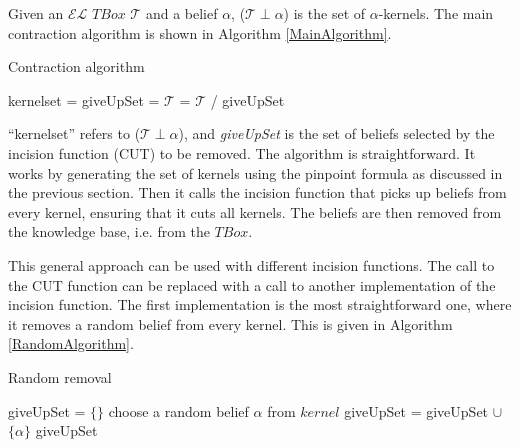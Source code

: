 Given an $\mathcal{EL}$ $TBox$ $\mathcal{T}$ and a belief $\alpha$, ($\mathcal{T} \perp \alpha$) is the set of $\alpha$-kernels. The main contraction algorithm is shown in Algorithm \ref{MainAlgorithm}.

\begin{algorithm}
\caption{Contraction algorithm}
\label{MainAlgorithm}
\begin{algorithmic}[1]
\State kernelset = 
\State giveUpSet = 
\State $\mathcal{T}$ = $\mathcal{T}$ / giveUpSet
\EndProcedure
\end{algorithmic}
\end{algorithm}

``kernelset'' refers to ($\mathcal{T} \perp \alpha$), and \textit{giveUpSet} is the set of beliefs selected by the incision function (CUT) to be removed. The algorithm is straightforward. It works by generating the set of kernels using the pinpoint formula as discussed in the previous section. Then it calls the incision function that picks up beliefs from every kernel, ensuring that it cuts all kernels. The beliefs are then removed from the knowledge base, i.e. from the $TBox$.

This general approach can be used with different incision functions. The call to the CUT function can be replaced with a call to another implementation of the incision function. The first implementation is the most straightforward one, where it removes a random belief from every kernel. This is given in Algorithm \ref{RandomAlgorithm}.

\begin{algorithm}
\caption{Random removal}
\label{RandomAlgorithm}
\begin{algorithmic}[1]
\State giveUpSet = $\lbrace \rbrace$
\State choose a random belief $\alpha$ from $kernel$
\State giveUpSet = giveUpSet $\cup$ $\lbrace \alpha \rbrace$
\EndFor \State
\Return giveUpSet
\EndFunction
\end{algorithmic}
\end{algorithm}

